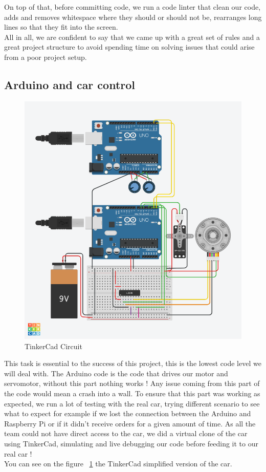 \documentclass[12pt]{article}
\begin{document}
On top of that, before committing code, we run a code linter that clean our code, adds and removes whitespace where they should or should not be, rearranges long lines so that they fit into the screen. \\
All in  all, we are confident to say that we came up with a great set of rules and a great project structure to avoid spending time on solving issues that could arise from a poor project setup.

\newpage

\subsection{Arduino and car control}

\begin{figure}[b!]
    \includegraphics[width=\textwidth]{../../docs/car-hardware.png}
    \caption{TinkerCad Circuit}
    \label{fig:tinkercad}
\end{figure}

This task is essential to the success of this project, this is the lowest code level we will deal with. The Arduino code is the code that drives our motor and servomotor, without this part nothing works ! Any issue coming from this part of the code would mean a crash into a wall. To ensure that this part was working as expected, we run a lot of testing with the real car, trying different scenario to see what to expect for example if we lost the connection between the Arduino and Raspberry Pi or if it didn't receive orders for a given amount of time. As all the team could not have direct access to the car, we did a virtual clone of the car using TinkerCad, simulating and live debugging our code before feeding it to our real car !\\
You can see on the figure ~\ref{fig:tinkercad} the TinkerCad simplified version of the car.
\end{document}
